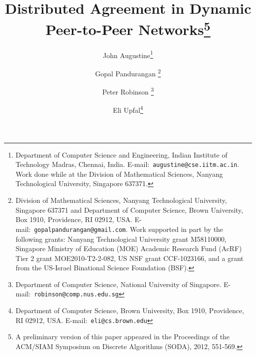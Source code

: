 \documentclass[leqno,11pt]{article}
\begin{document}
\title{Distributed Agreement in Dynamic Peer-to-Peer Networks\footnote{A preliminary version of this paper appeared in the Proceedings of the  ACM/SIAM Symposium on Discrete Algorithms (SODA), 2012, 551-569.}}
\author{John Augustine\thanks{Department of Computer Science and Engineering, Indian Institute of Technology Madras, Chennai, India.  \hbox{E-mail}:~{\tt augustine@cse.iitm.ac.in}. Work done while at the 
Division of Mathematical Sciences, Nanyang Technological University, Singapore 637371.}  \and Gopal Pandurangan \thanks{Division of Mathematical
Sciences, Nanyang Technological University, Singapore 637371 and Department of Computer Science, Brown University, Box 1910, Providence, RI 02912, USA.  \hbox{E-mail}:~{\tt gopalpandurangan@gmail.com}. Work supported in part by the following grants: Nanyang Technological University grant M58110000, Singapore Ministry of Education (MOE) Academic Research Fund (AcRF) Tier 2 grant MOE2010-T2-2-082,
US NSF grant CCF-1023166, and a grant from the US-Israel Binational Science
Foundation (BSF).} \and Peter Robinson \thanks{Department of Computer Science, National University of Singapore. \hbox{E-mail}:~{\tt robinson@comp.nus.edu.sg}}
\and Eli Upfal\thanks{Department of Computer Science, Brown University, Box 1910,
Providence, RI 02912, USA. \hbox{E-mail}:~{\tt eli@cs.brown.edu}}}

\date{}

\maketitle
\end{document}
